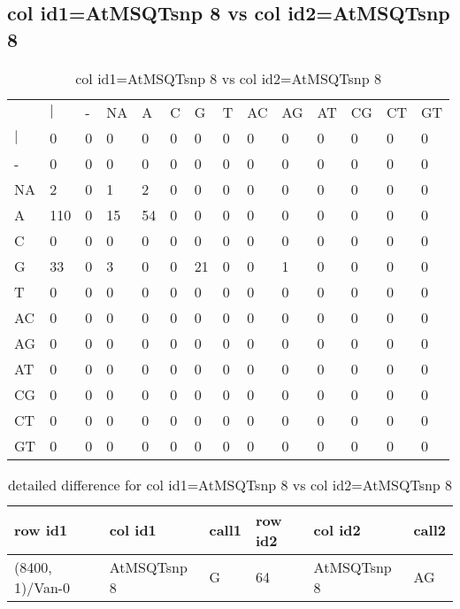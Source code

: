 \subsection{col id1=AtMSQTsnp 8 vs col id2=AtMSQTsnp 8}
\begin{center}
\begin{longtable}{|l|l|l|l|l|l|l|l|l|l|l|l|l|l|}
\caption{col id1=AtMSQTsnp 8 vs col id2=AtMSQTsnp 8} \label{table_dm766}\\
\hline
\\
\hline
&$|$&-&NA&A&C&G&T&AC&AG&AT&CG&CT&GT\\
$|$&0&0&0&0&0&0&0&0&0&0&0&0&0\\
-&0&0&0&0&0&0&0&0&0&0&0&0&0\\
NA&2&0&1&2&0&0&0&0&0&0&0&0&0\\
A&110&0&15&54&0&0&0&0&0&0&0&0&0\\
C&0&0&0&0&0&0&0&0&0&0&0&0&0\\
G&33&0&3&0&0&21&0&0&1&0&0&0&0\\
T&0&0&0&0&0&0&0&0&0&0&0&0&0\\
AC&0&0&0&0&0&0&0&0&0&0&0&0&0\\
AG&0&0&0&0&0&0&0&0&0&0&0&0&0\\
AT&0&0&0&0&0&0&0&0&0&0&0&0&0\\
CG&0&0&0&0&0&0&0&0&0&0&0&0&0\\
CT&0&0&0&0&0&0&0&0&0&0&0&0&0\\
GT&0&0&0&0&0&0&0&0&0&0&0&0&0\\
\hline
\end{longtable}
\end{center}

\begin{center}
\begin{longtable}{|l|l|l|l|l|l|}
\caption{detailed difference for col id1=AtMSQTsnp 8 vs col id2=AtMSQTsnp 8} \label{table_dm767}\\
\hline
row id1&col id1&call1&row id2&col id2&call2\\
\hline
(8400, 1)/Van-0&AtMSQTsnp 8&G&64&AtMSQTsnp 8&AG\\
\hline
\end{longtable}
\end{center}

